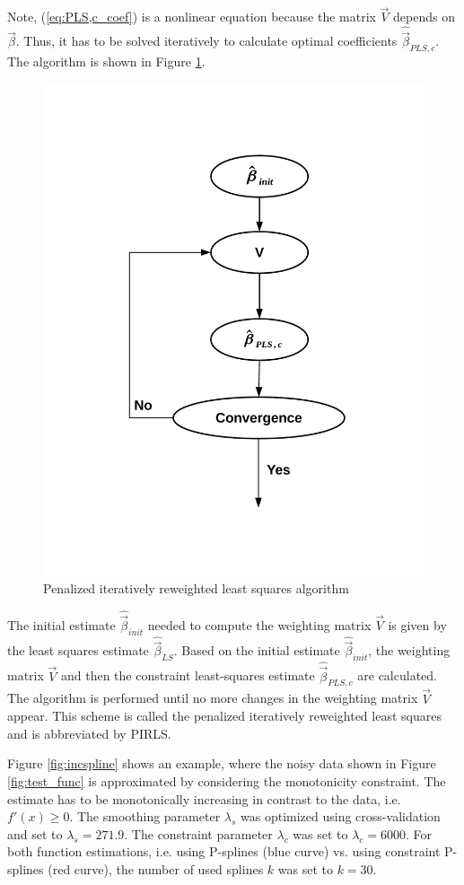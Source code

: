 \documentclass[10pt,a4paper]{report}
\begin{document}
Note, (\ref{eq:PLS,c_coef}) is a nonlinear equation because the matrix $\vec{V}$ depends on $\vec{\beta}$. Thus, it has to be solved iteratively to calculate optimal coefficients $\hat{\vec{\beta}}_{PLS,c}$. The algorithm is shown in Figure \ref{fig:pirls}. 

\begin{figure}[H]
	\centering
	\includegraphics[width=0.6\linewidth]{../thesisplots/algorithm.pdf}
	\caption{Penalized iteratively reweighted least squares algorithm}
	\label{fig:pirls}
\end{figure}


The initial estimate $\hat{\vec{\beta}}_{init}$ needed to compute the weighting matrix $\vec{V}$ is given by the least squares estimate $\hat{\vec{\beta}}_{LS}$. Based on the initial estimate $\hat{\vec{\beta}}_{init}$, the weighting matrix $\vec{V}$ and then the constraint least-squares estimate $\hat{\vec{\beta}}_{PLS,c}$ are calculated. The algorithm is performed until no more changes in the weighting matrix $\vec{V}$ appear. This scheme is called the penalized iteratively reweighted least squares and is abbreviated by PIRLS. \cite{hofner2011monotonicity}


Figure \ref{fig:incspline} shows an example, where the noisy data shown in Figure \ref{fig:test_func} is approximated by considering the monotonicity constraint. The estimate has to be monotonically increasing in contrast to the data, i.e. $f'(x) \ge 0$.  The smoothing parameter $\lambda_s$ was optimized using cross-validation and set to $\lambda_s=271.9$. The constraint parameter $\lambda_c$ was set to $\lambda_c = 6000$. For both function estimations, i.e. using P-splines (blue curve) vs. using constraint P-splines (red curve), the number of used splines $k$ was set to $k=30$. 	
\end{document}
